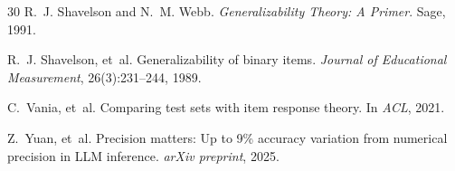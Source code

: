 \documentclass[letterpaper]{article}
\begin{document}
\begin{thebibliography}{30}
R.~J. Shavelson and N.~M. Webb.
\newblock \emph{Generalizability Theory: A Primer}.
\newblock Sage, 1991.

R.~J. Shavelson, et~al.
\newblock Generalizability of binary items.
\newblock \emph{Journal of Educational Measurement}, 26(3):231--244, 1989.

C.~Vania, et~al.
\newblock Comparing test sets with item response theory.
\newblock In \emph{ACL}, 2021.

Z.~Yuan, et~al.
\newblock Precision matters: Up to 9\% accuracy variation from numerical precision in LLM inference.
\newblock \emph{arXiv preprint}, 2025.

\end{thebibliography}
\end{document}
